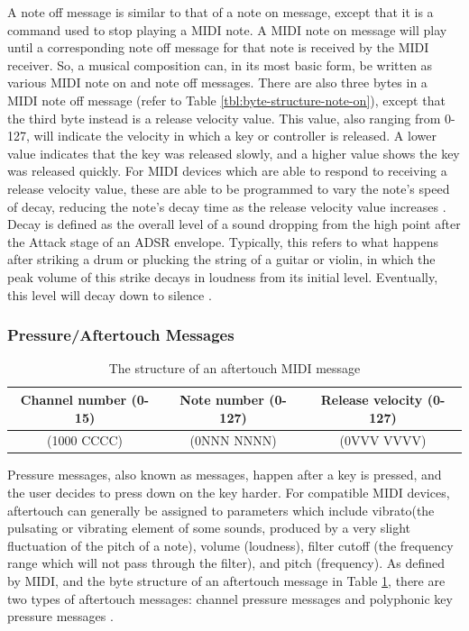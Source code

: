 A note off message is similar to that of a note on message, except that it is a command used to stop playing a MIDI note. A MIDI note on message will play until a corresponding note off message for that note is received by the MIDI receiver. So, a musical composition can, in its most basic form, be written as various MIDI note on and note off messages. There are also three bytes in a MIDI note off message (refer to Table \ref{tbl:byte-structure-note-on}), except that the third byte instead is a release velocity value. This value, also ranging from 0-127, will indicate the velocity in which a key or controller is released. A lower value indicates that the key was released slowly, and a higher value shows the key was released quickly. For MIDI devices which are able to respond to receiving a release velocity value, these are able to be programmed to vary the note's speed of decay, reducing the note's decay time as the release velocity value increases \cite{Kirk_Hunt_2013}. Decay is defined as the overall level of a sound dropping from the high point after the Attack stage of an ADSR envelope. Typically, this refers to what happens after striking a drum or plucking the string of a guitar or violin, in which the peak volume of this strike decays in loudness from its initial level. Eventually, this level will decay down to silence \cite{Meyer_2016}.

\subsubsection{Pressure/Aftertouch Messages}

\begin{table}
	\centering
	\begin{tabular}{|c|c|c|}
	\hline
		Channel number (0-15) & Note number (0-127) & Release velocity (0-127) \\
		\hline
		(1000 CCCC) & (0NNN NNNN) & (0VVV VVVV) \\
	\hline
	\end{tabular}
	\caption{The structure of an aftertouch MIDI message}
	\label{tbl:byte-structure-aftertouch}
\end{table}

Pressure messages, also known as  messages, happen after a key is pressed, and the user decides to press down on the key harder. For compatible MIDI devices, aftertouch can generally be assigned to parameters which include vibrato(the pulsating or vibrating element of some sounds, produced by a very slight fluctuation of the pitch of a note), volume (loudness), filter cutoff (the frequency range which will not pass through the filter), and pitch (frequency). As defined by MIDI, and the byte structure of an aftertouch message in Table \ref{tbl:byte-structure-aftertouch}, there are two types of aftertouch messages: channel pressure messages and polyphonic key pressure messages \cite{Huber_2012}. 

